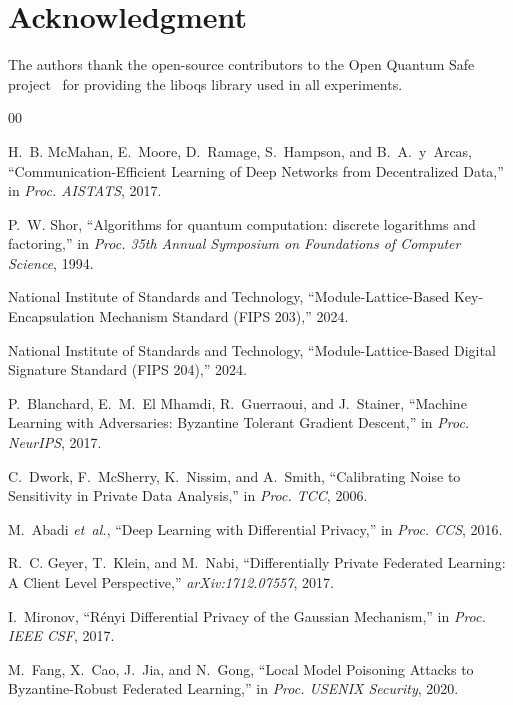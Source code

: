 \documentclass[conference]{IEEEtran}
\begin{document}
\section*{Acknowledgment}
The authors thank the open-source contributors to the Open Quantum
Safe project~\cite{oqs} for providing the liboqs library used in
all experiments.

\begin{thebibliography}{00}

H.~B. McMahan, E.~Moore, D.~Ramage, S.~Hampson, and B.~A.~y~Arcas,
``Communication-Efficient Learning of Deep Networks from Decentralized
Data,'' in \emph{Proc. AISTATS}, 2017.

P.~W. Shor, ``Algorithms for quantum computation: discrete logarithms
and factoring,'' in \emph{Proc. 35th Annual Symposium on Foundations
of Computer Science}, 1994.

National Institute of Standards and Technology,
``Module-Lattice-Based Key-Encapsulation Mechanism Standard (FIPS 203),''
2024.

National Institute of Standards and Technology,
``Module-Lattice-Based Digital Signature Standard (FIPS 204),''
2024.

P.~Blanchard, E.~M.~El Mhamdi, R.~Guerraoui, and J.~Stainer,
``Machine Learning with Adversaries: Byzantine Tolerant Gradient
Descent,'' in \emph{Proc. NeurIPS}, 2017.

C.~Dwork, F.~McSherry, K.~Nissim, and A.~Smith,
``Calibrating Noise to Sensitivity in Private Data Analysis,''
in \emph{Proc. TCC}, 2006.

M.~Abadi \emph{et~al.}, ``Deep Learning with Differential Privacy,''
in \emph{Proc. CCS}, 2016.

R.~C. Geyer, T.~Klein, and M.~Nabi,
``Differentially Private Federated Learning: A Client Level
Perspective,'' \emph{arXiv:1712.07557}, 2017.

I.~Mironov, ``R\'{e}nyi Differential Privacy of the Gaussian
Mechanism,'' in \emph{Proc. IEEE CSF}, 2017.

M.~Fang, X.~Cao, J.~Jia, and N.~Gong,
``Local Model Poisoning Attacks to Byzantine-Robust Federated
Learning,'' in \emph{Proc. USENIX Security}, 2020.


\end{thebibliography}
\end{document}
